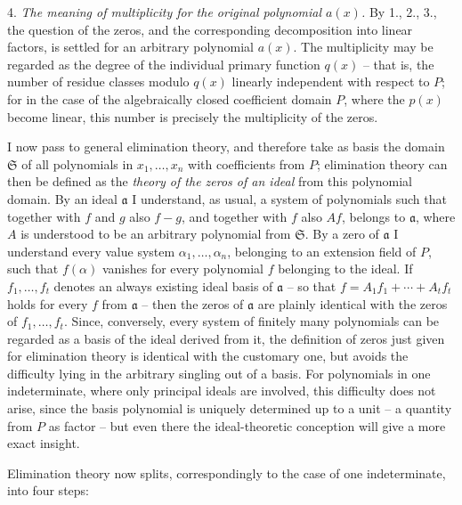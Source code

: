 4. \emph{The meaning of multiplicity for the original polynomial $a(x)$.} By 1., 2., 3., the question of the zeros, and the corresponding decomposition into linear factors, is settled for an arbitrary polynomial $a(x)$. The multiplicity may be regarded as the degree of the individual primary function $q(x)$ -- that is, the number of residue classes modulo $q(x)$ linearly independent with respect to $P$; for in the case of the algebraically closed coefficient domain $P$, where the $p(x)$ become linear, this number is precisely the multiplicity of the zeros.

I now pass to general elimination theory, and therefore take as basis the domain $\mathfrak S$ of all polynomials in $x_1,\ldots,x_n$ with coefficients from $P$; elimination theory can then be defined as the \emph{theory of the zeros of an ideal} from this polynomial domain. By an ideal $\mathfrak a$ I understand, as usual, a system of polynomials such that together with $f$ and $g$ also $f-g$, and together with $f$ also $Af$, belongs to $\mathfrak a$, where $A$ is understood to be an arbitrary polynomial from $\mathfrak S$. By a zero of $\mathfrak a$ I understand every value system $\alpha_1,\ldots,\alpha_n$, belonging to an extension field of $P$, such that $f(\alpha)$ vanishes for every polynomial $f$ belonging to the ideal. If $f_1,\ldots,f_t$ denotes an always existing ideal basis of $\mathfrak a$ -- so that $f=A_1f_1+\cdots+A_tf_t$ holds for every $f$ from $\mathfrak a$ -- then the zeros of $\mathfrak a$ are plainly identical with the zeros of $f_1,\ldots,f_t$. Since, conversely, every system of finitely many polynomials can be regarded as a basis of the ideal derived from it, the definition of zeros just given for elimination theory is identical with the customary one, but avoids the difficulty lying in the arbitrary singling out of a basis. For polynomials in one indeterminate, where only principal ideals are involved, this difficulty does not arise, since the basis polynomial is uniquely determined up to a unit -- a quantity from $P$ as factor -- but even there the ideal-theoretic conception will give a more exact insight.

Elimination theory now splits, correspondingly to the case of one indeterminate, into four steps:

